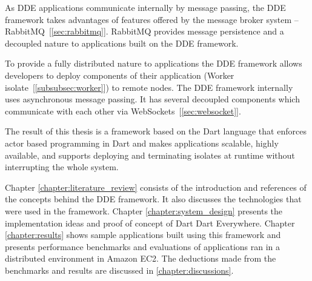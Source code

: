   As \acrshort{DDE} applications communicate internally by message passing, the \acrshort{DDE} framework takes advantages of features offered by the message broker system – RabbitMQ~[\autoref{sec:rabbitmq}]. RabbitMQ provides message persistence and a decoupled nature to applications built on the \acrshort{DDE} framework.

  To provide a fully distributed nature to applications the \acrshort{DDE} framework allows developers to deploy components of their application (Worker isolate~[\autoref{subsubsec:worker}]) to remote nodes. The \acrshort{DDE} framework internally uses asynchronous message passing. It has several decoupled components which communicate with each other via WebSockets~[\autoref{sec:websocket}].

  The result of this thesis is a framework based on the Dart language that enforces actor based programming in Dart and makes applications scalable, highly available, and supports deploying and terminating isolates at runtime without interrupting the whole system.

 Chapter \ref{chapter:literature_review} consists of the introduction and references of the concepts behind the \acrshort{DDE} framework. It also discusses the technologies that were used in the framework. Chapter \ref{chapter:system_design} presents the implementation ideas and proof of concept of Dart Dart Everywhere. Chapter \ref{chapter:results} shows sample applications built using this framework and presents performance benchmarks and evaluations of applications ran in a distributed environment in Amazon EC2. The deductions made from the benchmarks and results are discussed in \autoref{chapter:discussions}.
